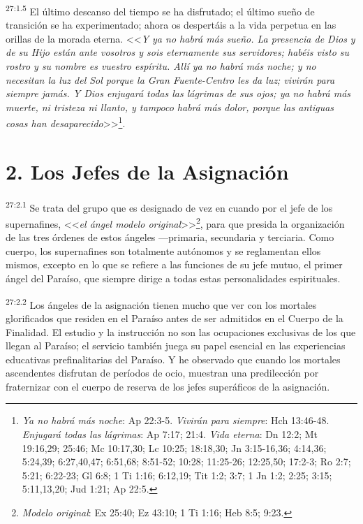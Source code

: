 \par
\textsuperscript{27:1.5} El último descanso del tiempo se ha disfrutado; el último sueño de transición se ha experimentado; ahora os despertáis a la vida perpetua en las orillas de la morada eterna. <<\textit{Y ya no habrá más sueño. La presencia de Dios y de su Hijo están ante vosotros y sois eternamente sus servidores; habéis visto su rostro y su nombre es vuestro espíritu. Allí ya no habrá más noche; y no necesitan la luz del Sol porque la Gran Fuente-Centro les da luz; vivirán para siempre jamás. Y Dios enjugará todas las lágrimas de sus ojos; ya no habrá más muerte, ni tristeza ni llanto, y tampoco habrá más dolor, porque las antiguas cosas han desaparecido}>>\footnote{\textit{Ya no habrá más noche}: Ap 22:3-5. \textit{Vivirán para siempre}: Hch 13:46-48. \textit{Enjugará todas las lágrimas}: Ap 7:17; 21:4. \textit{Vida eterna}: Dn 12:2; Mt 19:16,29; 25:46; Mc 10:17,30; Lc 10:25; 18:18,30; Jn 3:15-16,36; 4:14,36; 5:24,39; 6:27,40,47; 6:51,68; 8:51-52; 10:28; 11:25-26; 12:25,50; 17:2-3; Ro 2:7; 5:21; 6:22-23; Gl 6:8; 1 Ti 1:16; 6:12,19; Tit 1:2; 3:7; 1 Jn 1:2; 2:25; 3:15; 5:11,13,20; Jud 1:21; Ap 22:5.}.

\section*{2. Los Jefes de la Asignación}
\par
\textsuperscript{27:2.1} Se trata del grupo que es designado de vez en cuando por el jefe de los supernafines, <<\textit{el ángel modelo original}>>\footnote{\textit{Modelo original}: Ex 25:40; Ez 43:10; 1 Ti 1:16; Heb 8:5; 9:23.}, para que presida la organización de las tres órdenes de estos ángeles ---primaria, secundaria y terciaria. Como cuerpo, los supernafines son totalmente autónomos y se reglamentan ellos mismos, excepto en lo que se refiere a las funciones de su jefe mutuo, el primer ángel del Paraíso, que siempre dirige a todas estas personalidades espirituales.

\par
\textsuperscript{27:2.2} Los ángeles de la asignación tienen mucho que ver con los mortales glorificados que residen en el Paraíso antes de ser admitidos en el Cuerpo de la Finalidad. El estudio y la instrucción no son las ocupaciones exclusivas de los que llegan al Paraíso; el servicio también juega su papel esencial en las experiencias educativas prefinalitarias del Paraíso. Y he observado que cuando los mortales ascendentes disfrutan de períodos de ocio, muestran una predilección por fraternizar con el cuerpo de reserva de los jefes superáficos de la asignación.

